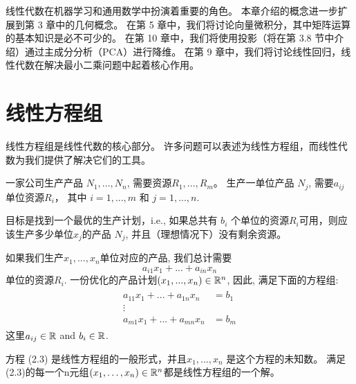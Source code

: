 线性代数在机器学习和通用数学中扮演着重要的角色。
本章介绍的概念进一步扩展到第 3 章中的几何概念。
在第 5 章中，我们将讨论向量微积分，其中矩阵运算的基本知识是必不可少的。
在第 10 章中，我们将使用投影（将在第 3.8 节中介绍）通过主成分分析（PCA）进行降维。
在第 9 章中，我们将讨论线性回归，线性代数在解决最小二乘问题中起着核心作用。

\section{线性方程组}

线性方程组是线性代数的核心部分。
许多问题可以表述为线性方程组，而线性代数为我们提供了解决它们的工具。

\begin{example}
    一家公司生产产品 $N_1,...,N_n$, 需要资源$R_1 ,..., R_m$。
    生产一单位产品 $N_j$, 需要$a_{ij}$单位资源$R_i$，
    其中 $i = 1,..., m$ 和 $j = 1,...,n$.
    
    目标是找到一个最优的生产计划，i.e.,
    如果总共有 $b_i$ 个单位的资源$R_i$可用，则应该生产多少单位$x_j$的产品 $N_j$,
    并且（理想情况下）没有剩余资源。
    
    如果我们生产$x_1, ..., x_n$单位对应的产品, 我们总计需要
    \begin{equation}
        a_{i1}x_1 + ... + a_{in}x_n
    \end{equation}
    单位的资源$R_i$.
    一份优化的产品计划$(x_1, ..., x_n) \in \mathbb{R}^n$, 因此, 满足下面的方程组:
    \begin{equation}
    \begin{aligned}
            \begin{array}{rl}
                a_{11}x_1 + ... + a_{1n}x_n &= b_1 \\
                \vdots\\
                a_{m1}x_1 + ... + a_{mn}x_n &= b_m
            \end{array}
    \end{aligned}
    \end{equation}
    这里$a_{ij} \in \mathbb{R}$ and $b_i \in \mathbb{R}$.
\end{example}

方程 (2.3) 是线性方程组的一般形式，并且$x_1,..., x_n$ 是这个方程的未知数。
满足(2.3)的每一个n元组$(x_1,\dots, x_n ) \in \mathbb{R}^n$都是线性方程组的一个解。

